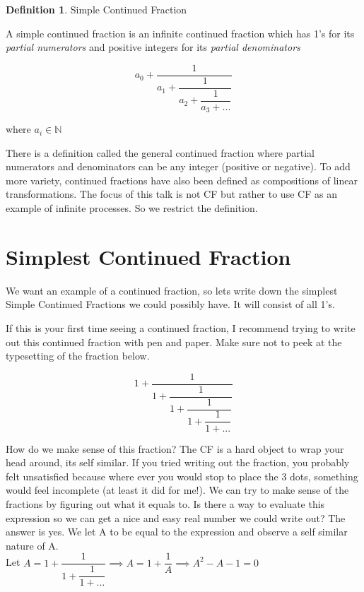 \documentclass[psamsfonts]{amsart}
\theoremstyle{definition}
\newtheorem{defn}[thm]{Definition}
\theoremstyle{remark}
\numberwithin{equation}{section}
\begin{document}
\begin{defn} Simple Continued Fraction

          A simple continued fraction is an infinite continued fraction which has 1's for its \textit{partial numerators}  and  positive integers for its \textit{partial denominators}
    
    $$ a_0 + \dfrac{1}{a_1 + \dfrac{1}{a_2 + \dfrac{1}{a_3 + ...}}}$$

    where $a_i \in \mathbb{N}$

\end{defn}

There is a definition called the general continued fraction where partial numerators and denominators can be any integer (positive or negative). To add more variety, continued fractions have also been defined as compositions of linear transformations. The focus of this talk is not CF but rather to use CF as an example of infinite processes. So we restrict the definition.


\section{Simplest Continued Fraction }

We want an example of a continued fraction, so lets write down the simplest Simple Continued Fractions we could possibly have. It will consist of all 1's.

If this is your first time seeing a continued fraction, I recommend trying to write out this continued fraction with pen and paper. Make sure not to peek at the typesetting of the fraction below.

$$1+\dfrac{1}{1+ \dfrac{1}{1+ \dfrac{1}{1+ \dfrac{1}{1+ ...}}}}$$

How do we make sense of this fraction? The CF is a hard object to wrap your head around, its self similar. If you tried writing out the fraction, you probably felt unsatisfied because where ever you would stop to place the 3 dots, something would feel incomplete (at least it did for me!). We can try to make sense of the fractions by figuring out what it equals to. Is there a way to evaluate this expression so we can get a nice and easy real number we could write out? The answer is yes. We let A to be equal to the expression and observe a self similar nature of A.\\

Let $A = 1+\dfrac{1}{1+ \dfrac{1}{1+ ...}} \implies A=1+\dfrac{1}{A} \implies A^2-A-1=0  $\\
\end{document}
